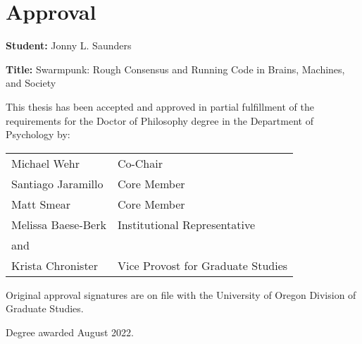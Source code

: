 
\chapter*{Approval}

\noindent\textbf{Student:} Jonny L. Saunders

\noindent\textbf{Title:} Swarmpunk: Rough Consensus and Running Code in Brains, Machines, and Society

\vspace{1cm}

\noindent This thesis has been accepted and approved in partial fulfillment of the requirements for the Doctor of Philosophy degree in the Department of Psychology by:

\vspace{1cm}

\noindent\begin{tabular}{@{}ll}
Michael Wehr & Co-Chair \\
Santiago Jaramillo & Core Member \\
Matt Smear & Core Member \\
Melissa Baese-Berk & Institutional Representative \\
and & \\
Krista Chronister & Vice Provost for Graduate Studies \\
\end{tabular}

\vspace{1cm}

\noindent Original approval signatures are on file with the University of Oregon Division of Graduate Studies.

\noindent Degree awarded August 2022.
